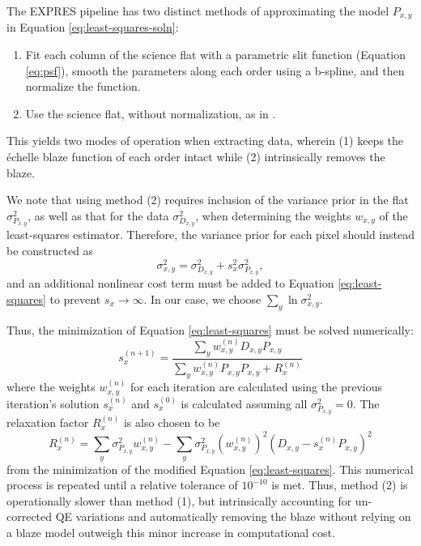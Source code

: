 The EXPRES pipeline has two distinct methods of approximating the model $P_{x,y}$ in Equation \ref{eq:least-squares-soln}:
\begin{enumerate}
    \item Fit each column of the science flat with a parametric slit function (Equation \ref{eq:psf}), smooth the parameters along each order using a b-spline, and then normalize the function.
    \item Use the science flat, without normalization, as in \citet{zechmeister_flat-relative_2014}.
\end{enumerate}
This yields two modes of operation when extracting data, wherein (1) keeps the \'echelle blaze function of each order intact while (2) intrinsically removes the blaze.

We note that using method (2) requires inclusion of the variance prior in the flat $\sigma_{P_{x,y}}^2$, as well as that for the data $\sigma_{D_{x,y}}^2$, when determining the weights $w_{x,y}$ of the least-squares estimator. Therefore, the variance prior for each pixel should instead be constructed as
\begin{equation}
    \sigma^2_{x,y} = \sigma^2_{D_{x,y}} + s^2_x \sigma^2_{P_{x,y}},
\end{equation}
and an additional nonlinear cost term must be added to Equation \ref{eq:least-squares} to prevent $s_x \rightarrow \infty$. In our case, we choose $\sum_y \ln{\sigma^2_{x,y}}$.

Thus, the minimization of Equation \ref{eq:least-squares} must be solved numerically:
\begin{equation}
    s_x^{(n+1)} = \frac{\sum_y{ w^{(n)}_{x,y} D_{x,y} P_{x,y}  }}{\sum_y{ w^{(n)}_{x,y} P_{x,y} P_{x,y}} + R^{(n)}_x}
    \label{eq:numerical-soln}
\end{equation}
where the weights $w^{(n)}_{x,y}$ for each iteration are calculated using the previous iteration's solution $s^{(n)}_x$ and $s^{(0)}_x$ is calculated assuming all $\sigma^2_{P_{x,y}} = 0$. The relaxation factor $R^{(n)}_x$ is also chosen to be
\begin{equation}
    R^{(n)}_x = \sum_y \sigma^2_{P_{x,y}} w^{(n)}_{x,y} - \sum_y \sigma^2_{P_{x,y}} \left( w^{(n)}_{x,y} \right)^2 \left( D_{x,y} - s_x^{(n)} P_{x,y} \right)^2
    \label{eq:relaxation}
\end{equation}
from the minimization of the modified Equation \ref{eq:least-squares}. This numerical process is repeated until a relative tolerance of $10^{-10}$ is met. Thus, method (2) is operationally slower than method (1), but intrinsically accounting for un-corrected QE variations and automatically removing the blaze without relying on a blaze model outweigh this minor increase in computational cost.


